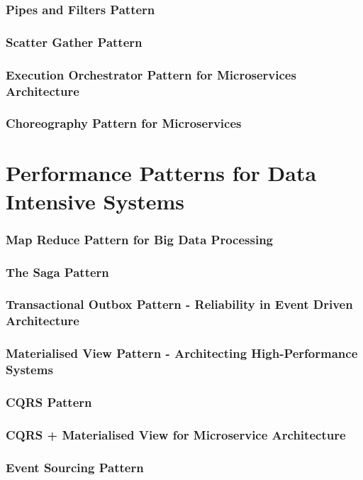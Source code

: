 \documentclass[a4paper, 11pt]{book}
\begin{document}
    \subsubsection{Pipes and Filters Pattern}
    \subsubsection{Scatter Gather Pattern}
    \subsubsection{Execution Orchestrator Pattern for Microservices Architecture}
    \subsubsection{Choreography Pattern for Microservices}

    \section{Performance Patterns for Data Intensive Systems}

    \subsubsection{Map Reduce Pattern for Big Data Processing}
    \subsubsection{The Saga Pattern}
    \subsubsection{Transactional Outbox Pattern - Reliability in Event Driven Architecture}
    \subsubsection{Materialised View Pattern - Architecting High-Performance Systems}
    \subsubsection{CQRS Pattern}
    \subsubsection{CQRS + Materialised View for Microservice Architecture}
    \subsubsection{Event Sourcing Pattern}
\end{document}
